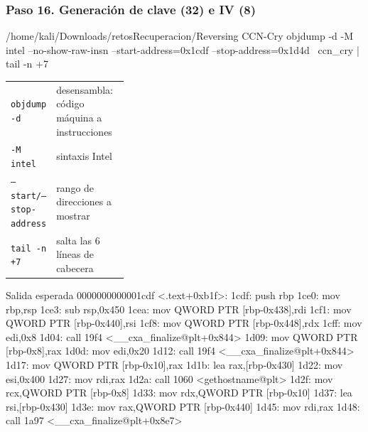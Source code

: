 \documentclass[11pt,a4paper]{article}
\begin{document}
\subsubsection*{Paso 16. Generación de clave (32) e IV (8)}
\begin{comando}{/home/kali/Downloads/retosRecuperacion/Reversing CCN-Cry}
objdump -d -M intel --no-show-raw-insn --start-address=0x1cdf --stop-address=0x1d4d \
  ccn_cry | tail -n +7
\end{comando}
\begin{tcolorbox}[enhanced, breakable, colback=white, colframe=gray!40, boxrule=0.3pt, arc=1pt, left=4pt, right=4pt, top=2pt, bottom=2pt, fonttitle=\sffamily\scriptsize\bfseries, coltitle=black!75, colbacktitle=gray!8, title={Qué hace cada parte}, attach title to upper, before skip=2pt, after skip=4pt, fontupper=\small]
\par{\renewcommand{\arraystretch}{1.12}\begin{tabularx}{\linewidth}{@{}>{\raggedright\arraybackslash}p{0.33\linewidth}>{\raggedright\arraybackslash}X@{}}
\texttt{objdump -d} & desensambla: código máquina a instrucciones \\
\texttt{-M intel} & sintaxis Intel \\
\texttt{--start/\allowbreak{}--stop-address} & rango de direcciones a mostrar \\
\texttt{tail -n +7} & salta las 6 líneas de cabecera \\
\end{tabularx}}
\end{tcolorbox}
\begin{salidan}{Salida esperada}
0000000000001cdf <.text+0xb1f>:
    1cdf:       push   rbp
    1ce0:       mov    rbp,rsp
    1ce3:       sub    rsp,0x450
    1cea:       mov    QWORD PTR [rbp-0x438],rdi
    1cf1:       mov    QWORD PTR [rbp-0x440],rsi
    1cf8:       mov    QWORD PTR [rbp-0x448],rdx
    1cff:       mov    edi,0x8
    1d04:       call   19f4 <__cxa_finalize@plt+0x844>
    1d09:       mov    QWORD PTR [rbp-0x8],rax
    1d0d:       mov    edi,0x20
    1d12:       call   19f4 <__cxa_finalize@plt+0x844>
    1d17:       mov    QWORD PTR [rbp-0x10],rax
    1d1b:       lea    rax,[rbp-0x430]
    1d22:       mov    esi,0x400
    1d27:       mov    rdi,rax
    1d2a:       call   1060 <gethostname@plt>
    1d2f:       mov    rcx,QWORD PTR [rbp-0x8]
    1d33:       mov    rdx,QWORD PTR [rbp-0x10]
    1d37:       lea    rsi,[rbp-0x430]
    1d3e:       mov    rax,QWORD PTR [rbp-0x440]
    1d45:       mov    rdi,rax
    1d48:       call   1a97 <__cxa_finalize@plt+0x8e7>
\end{salidan}
\end{document}
